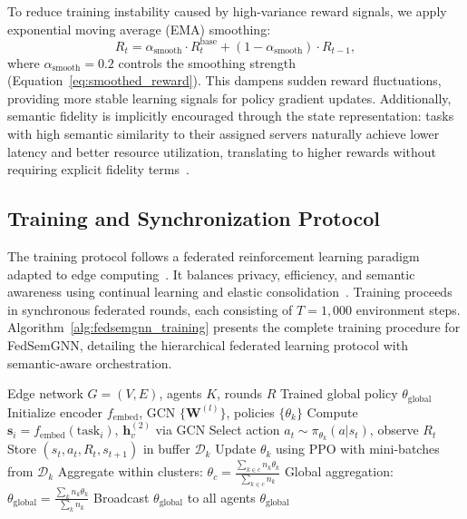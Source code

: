 \documentclass[conference]{IEEEtran}
\begin{document}
	To reduce training instability caused by high-variance reward signals, we apply exponential moving average (EMA) smoothing:
	\begin{equation}
		R_t = \alpha_{\text{smooth}} \cdot R_t^{\text{base}} + (1 - \alpha_{\text{smooth}}) \cdot R_{t-1},
		\label{eq:smoothed_reward}
	\end{equation}
	where $\alpha_{\text{smooth}} = 0.2$ controls the smoothing strength (Equation~\ref{eq:smoothed_reward}). This dampens sudden reward fluctuations, providing more stable learning signals for policy gradient updates. Additionally, semantic fidelity is implicitly encouraged through the state representation: tasks with high semantic similarity to their assigned servers naturally achieve lower latency and better resource utilization, translating to higher rewards without requiring explicit fidelity terms~\cite{ji2024resource}.
	
	\subsection{Training and Synchronization Protocol}
	
	The training protocol follows a federated reinforcement learning paradigm adapted to edge computing~\cite{grasso2022hhome, zhou2024qos}. It balances privacy, efficiency, and semantic awareness using continual learning and elastic consolidation~\cite{zhou2024robustfl}. Training proceeds in synchronous federated rounds, each consisting of $T = 1{,}000$ environment steps. Algorithm~\ref{alg:fedsemgnn_training} presents the complete training procedure for FedSemGNN, detailing the hierarchical federated learning protocol with semantic-aware orchestration.
	
	\begin{algorithm}[t]
		\caption{FedSemGNN Training Protocol}
		\label{alg:fedsemgnn_training}
		\begin{algorithmic}[1]
			\REQUIRE Edge network $G=(V,E)$, agents $K$, rounds $R$
			\ENSURE Trained global policy $\theta_{\text{global}}$
			\STATE Initialize encoder $f_{\text{embed}}$, GCN $\{\mathbf{W}^{(l)}\}$, policies $\{\theta_k\}$
			\STATE Compute $\mathbf{s}_i = f_{\text{embed}}(\text{task}_i)$, $\mathbf{h}_v^{(2)}$ via GCN
			\STATE Select action $a_t \sim \pi_{\theta_k}(a|s_t)$, observe $R_t$
			\STATE Store $(s_t, a_t, R_t, s_{t+1})$ in buffer $\mathcal{D}_k$
			\ENDFOR
			\STATE Update $\theta_k$ using PPO with mini-batches from $\mathcal{D}_k$
			\ENDFOR
			\STATE
			\STATE Aggregate within clusters: $\theta_c = \frac{\sum_{k \in c} n_k \theta_k}{\sum_{k \in c} n_k}$
			\ENDIF
			\STATE
			\STATE Global aggregation: $\theta_{\text{global}} = \frac{\sum_k n_k \theta_k}{\sum_k n_k}$
			\STATE Broadcast $\theta_{\text{global}}$ to all agents
			\ENDIF
			\ENDFOR
			\STATE
			\RETURN $\theta_{\text{global}}$
		\end{algorithmic}
	\end{algorithm}
	
\end{document}
